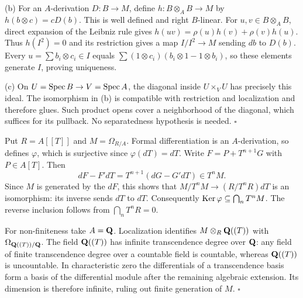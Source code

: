 \documentclass[11pt]{article}
\let\chapterexercise\exercise
\renewcommand{\exercise}[2]{\Needspace{8\baselineskip}\chapterexercise{#1}{#2}}
\begin{document}
(b) For an $A$-derivation $D:B\to M$, define $h:B\otimes_A B\to M$ by $h(b\otimes c)=cD(b)$. This is well defined and right $B$-linear. For $u,v\in B\otimes_A B$, direct expansion of the Leibniz rule gives $h(uv)=\rho(u)h(v)+\rho(v)h(u)$. Thus $h(I^2)=0$ and its restriction gives a map $I/I^2\to M$ sending $db$ to $D(b)$. Every $u=\sum b_i\otimes c_i\in I$ equals $\sum (1\otimes c_i)(b_i\otimes1-1\otimes b_i)$, so these elements generate $I$, proving uniqueness.

(c) On $U=\operatorname{Spec} B\to V=\operatorname{Spec} A$, the diagonal inside $U\times_VU$ has precisely this ideal. The isomorphism in (b) is compatible with restriction and localization and therefore glues. Such product opens cover a neighborhood of the diagonal, which suffices for its pullback. No separatedness hypothesis is needed. \hfill$\square$

\pf
Put $R=A[[T]]$ and $M=\Omega_{R/A}$. Formal differentiation is an $A$-derivation, so defines $\varphi$, which is surjective since $\varphi(dT)=dT$. Write $F=P+T^{n+1}G$ with $P\in A[T]$. Then
\[ dF-F'dT=T^{n+1}(dG-G'dT)\in T^nM. \]
Since $M$ is generated by the $dF$, this shows that $M/T^nM\to(R/T^nR)dT$ is an isomorphism: its inverse sends $dT$ to $dT$. Consequently $\operatorname{Ker}\varphi\subseteq\bigcap_n T^nM$. The reverse inclusion follows from $\bigcap_nT^nR=0$.

For non-finiteness take $A=\mathbf Q$. Localization identifies $M\otimes_R\mathbf Q((T))$ with $\Omega_{\mathbf Q((T))/\mathbf Q}$. The field $\mathbf Q((T))$ has infinite transcendence degree over $\mathbf Q$: any field of finite transcendence degree over a countable field is countable, whereas $\mathbf Q((T))$ is uncountable. In characteristic zero the differentials of a transcendence basis form a basis of the differential module after the remaining algebraic extension. Its dimension is therefore infinite, ruling out finite generation of $M$. \hfill$\square$
\end{document}
